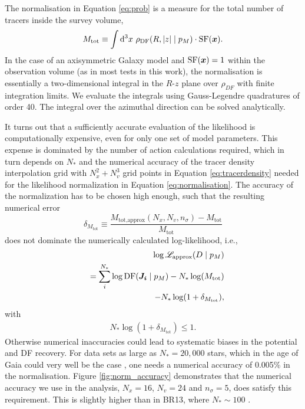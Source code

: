 The normalisation in Equation \ref{eq:prob} is a measure for the total number of tracers inside the survey volume,
\begin{equation}
M_\text{tot} \equiv \int \mathop{}\!\mathrm{d^3} x \  \rho_\text{DF}(R,|z| \mid p_M) \cdot \text{SF}(\boldsymbol{x}).\label{eq:normalisation}
\end{equation}
In the case of an axisymmetric Galaxy model and $\text{SF}(\boldsymbol{x})=1$ within the observation volume (as in most tests in this work), the normalisation is essentially a two-dimensional integral in the $R$-$z$ plane over $\rho_{DF}$ with finite integration limits. We evaluate the integrals using Gauss-Legendre quadratures of order 40. The integral over the azimuthal direction can be solved analytically. 

It turns out that a sufficiently accurate evaluation of the likelihood is computationally expensive, even for only one set of model parameters. This expense is dominated by the number of action calculations required, which in turn depends on $N_*$ and the numerical accuracy of the tracer density interpolation grid with $N_x^2+N_v^3$ grid points in Equation \ref{eq:tracerdensity} needed for the likelihood normalization in Equation \ref{eq:normalisation}. The accuracy of the normalization has to be chosen high enough, such that the resulting numerical error 
\begin{equation}
\delta_{M_\text{tot}} \equiv \frac{M_\text{tot,approx}(N_x,N_v,n_\sigma) -  M_\text{tot} }{M_\text{tot}}\label{eq:relerrlikelihood}
\end{equation}
does not dominate the numerically calculated log-likelihood, i.e.,
\begin{eqnarray}
& &\log \mathscr{L}_\text{approx}(D \mid p_M) \nonumber\\
&& = \sum_i^{N_*} \log \text{DF}(\boldsymbol{J_i} \mid p_M) - N_* \log(M_\text{tot})\nonumber\\
&& - N_* \log (1 + \delta_{M_\text{tot}}),\label{eq:loglikelihood_relerr}
\end{eqnarray}
with
\begin{eqnarray}
N_* \log (1 + \delta_{M_\text{tot}}) \leq 1.\nonumber
\end{eqnarray}
Otherwise numerical inaccuracies could lead to systematic biases in the potential and DF recovery. For data sets as large as $N_* = 20,000$ stars, which in the age of Gaia could very well be the case \HW{[TO DO: Really???]}, one needs a numerical accuracy of 0.005\% in the normalisation. Figure \ref{fig:norm_accuracy} demonstrates that the numerical accuracy we use in the analysis, $N_x=16$, $N_v=24$ and $n_\sigma=5$, does satisfy this requirement. This is slightly higher than in BR13, where $N_* \sim 100$ \Wilma{[TO DO: CHECK]}.\\


